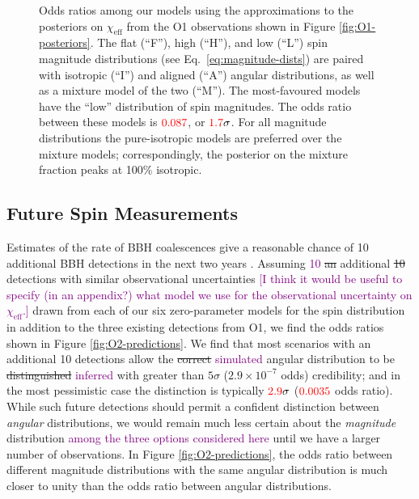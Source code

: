 \documentclass[modern,linenumbers]{aastex61}
\newcommand{\chieff}{\chi_\mathrm{eff}}
\newcommand{\checkme}[1]{\textcolor{red}{#1}}
\newcommand{\OOneSigmaIsoAligned}{\checkme{1.7}}
\newcommand{\OOneOddsIsoAligned}{\checkme{0.087}}
\newcommand{\OTwoSigmaIsoAlignedMin}{\checkme{2.9}}
\newcommand{\OTwoOddsIsoAlignedMin}{\checkme{0.0035}}
\newcommand{\ilya}[1]{\textcolor{purple}{#1}}
\begin{document}
\begin{figure}
  \caption{Odds ratios among our models using the approximations to
    the posteriors on $\chieff$ from the O1 observations shown in
    Figure \ref{fig:O1-posteriors}.  The flat (``F''), high (``H''),
    and low (``L'') spin magnitude distributions (see Eq.\
    \eqref{eq:magnitude-dists}) are paired with isotropic (``I'') and
    aligned (``A'') angular distributions, as well as a mixture model
    of the two (``$\mathrm{M}$'').  The most-favoured models have the
    ``low'' distribution of spin magnitudes.  The odds ratio between
    these models is $\OOneOddsIsoAligned$, or
    $\OOneSigmaIsoAligned\sigma$.  For all magnitude distributions the
    pure-isotropic models are preferred over the mixture models;
    correspondingly, the posterior on the mixture fraction peaks at
    100\% isotropic.}
  \label{fig:O1-odds}
\end{figure}

\subsection{Future Spin Measurements}
\label{subsec:future}

Estimates of the rate of \ac{BBH} coalescences give a reasonable
chance of 10 additional \ac{BBH} detections in the next two years
\citep{O1-BBH,2016ApJ...833L...1A,2016ApJS..227...14A}.  Assuming \ilya{10} \sout{an}
additional \sout{10} detections with similar observational uncertainties \ilya{[I think it would be useful to specify (in an appendix?) what model we use for the observational uncertainty on $\chieff$.]}
drawn from each of our six zero-parameter models for the spin
distribution in addition to the three existing detections from O1, we
find the odds ratios shown in Figure \ref{fig:O2-predictions}.  We
find that most scenarios with an additional 10 detections allow the
\sout{correct} \ilya{simulated} angular distribution to be \sout{distinguished} \ilya{inferred} with greater than
$5\sigma$ ($2.9 \times 10^{-7}$ odds) credibility; and in the most
pessimistic case the distinction is typically
$\OTwoSigmaIsoAlignedMin\sigma$ ($\OTwoOddsIsoAlignedMin$ odds ratio).
While such future detections should permit a confident distinction
between \emph{angular} distributions, we would remain much less certain
about the \emph{magnitude} distribution \ilya{among the three options considered here} until we have a larger number
of observations.  In Figure \ref{fig:O2-predictions}, the odds ratio
between different magnitude distributions with the same angular
distribution is much closer to unity than the odds ratio between angular
distributions.
\end{document}
